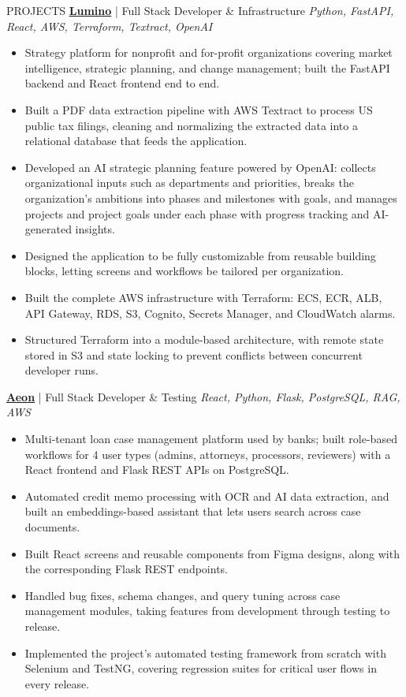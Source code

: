 \documentclass{resume} %
\begin{document}
\begin{rSection}{PROJECTS}
\textbf{\href{https://www.luminoinsight.com/}{Lumino}} | Full Stack Developer \& Infrastructure \hfill \textit{Python, FastAPI, React, AWS, Terraform, Textract, OpenAI}
\begin{itemize}
    \itemsep -3pt {}
    \item Strategy platform for nonprofit and for-profit organizations covering market intelligence, strategic planning, and change management; built the FastAPI backend and React frontend end to end.
    \item Built a PDF data extraction pipeline with AWS Textract to process US public tax filings, cleaning and normalizing the extracted data into a relational database that feeds the application.
    \item Developed an AI strategic planning feature powered by OpenAI: collects organizational inputs such as departments and priorities, breaks the organization's ambitions into phases and milestones with goals, and manages projects and project goals under each phase with progress tracking and AI-generated insights.
    \item Designed the application to be fully customizable from reusable building blocks, letting screens and workflows be tailored per organization.
    \item Built the complete AWS infrastructure with Terraform: ECS, ECR, ALB, API Gateway, RDS, S3, Cognito, Secrets Manager, and CloudWatch alarms.
    \item Structured Terraform into a module-based architecture, with remote state stored in S3 and state locking to prevent conflicts between concurrent developer runs.
\end{itemize}

\textbf{\href{https://aeonlegaltech.com/}{Aeon}} | Full Stack Developer \& Testing \hfill \textit{React, Python, Flask, PostgreSQL, RAG, AWS}
\begin{itemize}
    \itemsep -3pt {}
    \item Multi-tenant loan case management platform used by banks; built role-based workflows for 4 user types (admins, attorneys, processors, reviewers) with a React frontend and Flask REST APIs on PostgreSQL.
    \item Automated credit memo processing with OCR and AI data extraction, and built an embeddings-based assistant that lets users search across case documents.
    \item Built React screens and reusable components from Figma designs, along with the corresponding Flask REST endpoints.
    \item Handled bug fixes, schema changes, and query tuning across case management modules, taking features from development through testing to release.
    \item Implemented the project's automated testing framework from scratch with Selenium and TestNG, covering regression suites for critical user flows in every release.
\end{itemize}

\end{rSection}
\end{document}
